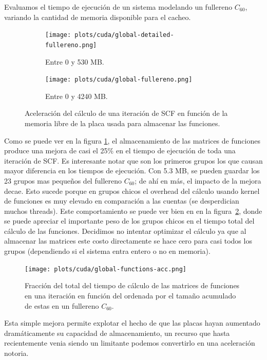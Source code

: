 Evaluamos el tiempo de ejecuci\'on de un sistema modelando un fullereno $C_{60}$, variando la
cantidad de memoria disponible para el cacheo.

\begin{figure}[htbp]
   \centering
   \begin{subfigure}[b]{\plotwidthtres}
     \texttt{[image: plots/cuda/global-detailed-fullereno.png]}
     \caption{Entre 0 y 530 MB.}
   \end{subfigure}
   \begin{subfigure}[b]{\plotwidthtres}
     \texttt{[image: plots/cuda/global-fullereno.png]}
     \caption{Entre 0 y 4240 MB.}
   \end{subfigure}
   \caption{Aceleraci\'on del c\'alculo de una iteraci\'on de SCF en funci\'on de la memoria libre de
   la placa usada para almacenar las funciones.}
   \label{plt:global-fullereno}
\end{figure}

Como se puede ver en la figura \ref{plt:global-fullereno}, el
almacenamiento de las matrices de funciones produce una mejora de casi el 25\% en el tiempo de ejecuci\'on
de toda una iteraci\'on de SCF. Es interesante notar que son los primeros grupos los que causan mayor
diferencia en los tiempos de ejecuci\'on. Con 5.3 MB, se pueden guardar los 23 grupos mas peque\~nos del
fullereno $C_{60}$; de ah\'i en m\'as, el impacto de la mejora decae. Esto sucede porque en grupos
chicos el overhead del c\'alculo usando kernel de funciones es muy elevado en comparaci\'on a las
cuentas (se desperdician muchos threads). Este comportamiento se puede ver
bien en en la figura~\ref{plt:runtime-functions-fullereno}, donde se puede apreciar el importante
peso de los grupos chicos en el tiempo total del c\'alculo de las funciones. Decidimos no intentar
optimizar el c\'alculo ya que al almacenar las matrices este costo directamente se hace cero para
casi todos los grupos (dependiendo si el sistema entra entero o no en memoria).

\begin{figure}[htbp]
   \centering
   \texttt{[image: plots/cuda/global-functions-acc.png]}
   \caption{Fracci\'on del total del tiempo de c\'alculo de las matrices de funciones en una iteraci\'on en funci\'on
   del ordenada por el tama\~no acumulado de estas en un fullereno $C_{60}$.}
   \label{plt:runtime-functions-fullereno}
\end{figure}

Esta simple mejora permite explotar el hecho de que las placas hayan aumentado dram\'aticamente su
capacidad de almacenamiento, un recurso que hasta recientemente venia siendo un limitante podemos
convertirlo en una aceleraci\'on notoria.

